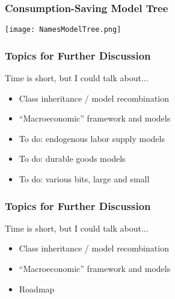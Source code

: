 \documentclass[11ptt]{beamer}
\begin{document}
\begin{frame}
\frametitle{Consumption-Saving Model Tree}
\begin{center}
\texttt{[image: NamesModelTree.png]}
\end{center}
\end{frame}


\begin{frame}\label{DiscussionTopics}
\frametitle{Topics for Further Discussion}

Time is short, but I could talk about...
\begin{itemize}
\item Class inheritance / model recombination \hyperlink{Recombination}{}

\item ``Macroeconomic'' framework and models \hyperlink{Macroeconomics}{}

\item To do: endogenous labor supply models  \hyperlink{LaborSupply}{}

\item To do: durable goods models \hyperlink{DurableGoods}{}

\item To do: various bits, large and small \hyperlink{StructuralChanges}{}
\end{itemize}
\end{frame}


\begin{frame}\label{DiscussionTopics}
\frametitle{Topics for Further Discussion}

Time is short, but I could talk about...
\begin{itemize}
\item Class inheritance / model recombination \hyperlink{Recombination}{}

\item ``Macroeconomic'' framework and models \hyperlink{Macroeconomics}{}

\item Roadmap \hyperlink{HARKFuture}{}
\end{itemize}
\end{frame}
\end{document}
